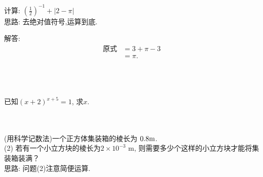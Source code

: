 \item{
    计算: $ (\frac{1}{2})^{-1} + \lvert 2-\pi \rvert $
    \ifshowSolution
    \fangsong{}
    \\
    思路: 去绝对值符号,运算到底.

    解答: 
    \begin{align*}
        \mbox{原式} &= 3 + \pi - 3\\
        &= \pi.
    \end{align*}
    \fi
    \unless\ifshowSolution
    \\ \\ \\
    \fi
}

\item{
    已知$(x+2)^{x+5}=1$, 求$x$.
}
\\ \\ \\

\item{
    (用科学记数法)一个正方体集装箱的棱长为 $0.8 \rm{m}$.\\
    (2) 若有一个小立方块的棱长为$2\times 10^{-3} $ m, 则需要多少个这样的小立方块才能将集装箱装满？
    \ifshowSolution
    \fangsong{}
    \\
    思路: 问题(2)注意简便运算.
    \fi
    \unless\ifshowSolution
    \\ \\ \\
    \fi
}